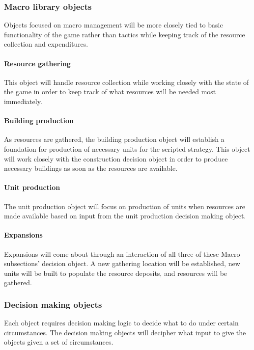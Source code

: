 \documentclass[10pt,letterpaper,onecolumn,draftclsnofoot]{IEEEtran}
\begin{document}
\subsubsection{Macro library objects}
Objects focused on macro management will be more closely tied to basic functionality of the game rather than tactics while keeping track of the resource collection and expenditures.

\paragraph{Resource gathering}
This object will handle resource collection while working closely with the state of the game in order to keep track of what resources will be needed most immediately. 

\paragraph{Building production}
As resources are gathered, the building production object will establish a foundation for production of necessary units for the scripted strategy. This object will work closely with the construction decision object in order to produce necessary buildings as soon as the resources are available.

\paragraph{Unit production}
The unit production object will focus on production of units when resources are made available based on input from the unit production decision making object. 

\paragraph{Expansions}
Expansions will come about through an interaction of all three of these Macro subsections' decision object. A new gathering location will be established, new units will be built to populate the resource deposits, and resources will be gathered.

\subsubsection{Decision making objects}
Each object requires decision making logic to decide what to do under certain circumstances. The decision making objects will decipher what input to give the objects given a set of circumstances.
\end{document}
